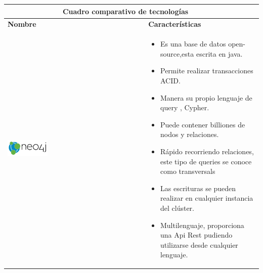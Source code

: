 	\begin{table}[b!]
    \centering
      \begin{tabular}{|p{2cm}|ll}
        \hline
        \multicolumn{2}{|c|}{{\bf Cuadro comparativo de tecnologías}} \\ 
        \hline
          \multicolumn{1}{|p{4cm}|}{{\bf Nombre}} & 
		  \multicolumn{1}{p{10cm}|}{{\bf Características}}\\

        \hline
          \multicolumn{1}{|p{5cm}|}{\includegraphics[width=0.3\textwidth]{images/neo4j}} & 
          \multicolumn{2}{p{10cm}|}{\begin{itemize}
          \vspace{-15mm}
        \item Es una base de datos open-source,esta escrita en java.
        \item Permite realizar transacciones ACID.
        \item Manera su propio lenguaje de query , Cypher.
        \item Puede contener billiones de nodos y relaciones.
        \item Rápido recorriendo relaciones, este tipo de queries se conoce como transversals
        \item Las escrituras se pueden realizar en cualquier instancia del clúster.
        \item Multilenguaje, proporciona una Api Rest pudiendo utilizarse desde cualquier lenguaje.
        \cite{31}
      \end{itemize}} \\
         

\end{tabular}
\end{table}
